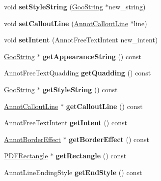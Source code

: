 \begin{DoxyCompactItemize}
void {\bfseries set\+Style\+String} (\hyperlink{class_goo_string}{Goo\+String} $\ast$new\+\_\+string)
\item 
\mbox{\label{class_annot_free_text_a995a89302932eab1bf759d5c688e66fd}} 
void {\bfseries set\+Callout\+Line} (\hyperlink{class_annot_callout_line}{Annot\+Callout\+Line} $\ast$line)
\item 
\mbox{\label{class_annot_free_text_a803a9c1b8534c0a7eff48ff117ddd597}} 
void {\bfseries set\+Intent} (Annot\+Free\+Text\+Intent new\+\_\+intent)
\item 
\mbox{\label{class_annot_free_text_a618ec0999ba53ee8849eb674e2b7ee09}} 
\hyperlink{class_goo_string}{Goo\+String} $\ast$ {\bfseries get\+Appearance\+String} () const
\item 
\mbox{\label{class_annot_free_text_a27d9a39457490817ed2c03ed8cff678f}} 
Annot\+Free\+Text\+Quadding {\bfseries get\+Quadding} () const
\item 
\mbox{\label{class_annot_free_text_acc4885f181a4187483752968c7bfbbc1}} 
\hyperlink{class_goo_string}{Goo\+String} $\ast$ {\bfseries get\+Style\+String} () const
\item 
\mbox{\label{class_annot_free_text_ab7fbe56f1af6a9bf0b9aa50a30fef717}} 
\hyperlink{class_annot_callout_line}{Annot\+Callout\+Line} $\ast$ {\bfseries get\+Callout\+Line} () const
\item 
\mbox{\label{class_annot_free_text_a70854a4f0e63d0b898999d57ba8ca7c0}} 
Annot\+Free\+Text\+Intent {\bfseries get\+Intent} () const
\item 
\mbox{\label{class_annot_free_text_a86fadac6776e986557c1e971df30fae9}} 
\hyperlink{class_annot_border_effect}{Annot\+Border\+Effect} $\ast$ {\bfseries get\+Border\+Effect} () const
\item 
\mbox{\label{class_annot_free_text_a8462a8ff86de52112df7afb5c2106b37}} 
\hyperlink{class_p_d_f_rectangle}{P\+D\+F\+Rectangle} $\ast$ {\bfseries get\+Rectangle} () const
\item 
\mbox{\label{class_annot_free_text_a4ac99b407724fa2a19af99461d0948e0}} 
Annot\+Line\+Ending\+Style {\bfseries get\+End\+Style} () const
\end{DoxyCompactItemize}
